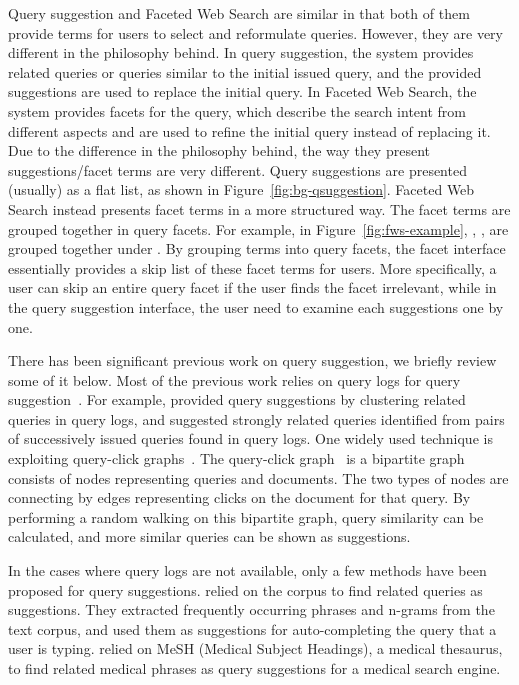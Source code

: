 Query suggestion and Faceted Web Search are similar in that both of them provide terms for users to select and reformulate queries. However, they are very different in the philosophy behind. In query suggestion, the system provides related queries or queries similar to the initial issued query, and the provided suggestions are used to replace the initial query. In Faceted Web Search, the system provides facets for the query, which describe the search intent from different aspects and are used to refine the initial query instead of replacing it. Due to the difference in the philosophy behind, the way they present suggestions/facet terms are very different. Query suggestions are presented (usually) as a flat list, as shown in Figure~\ref{fig:bg-qsuggestion}. Faceted Web Search instead presents facet terms in a more structured way. The facet terms are grouped together in query facets. For example, in Figure~\ref{fig:fws-example}, , ,  are grouped together under . By grouping terms into query facets, the facet interface essentially provides a skip list of these facet terms for users. More specifically, a user can skip an entire query facet if the user finds the facet irrelevant, while in the query suggestion interface, the user need to examine each suggestions one by one.


There has been significant previous work on query suggestion, we briefly review some of it below. Most of the previous work relies on query logs for query suggestion~\cite{baeza2004query,jones2006generating,mei2008query,ozertem2011suggestion}. For example, \citet{baeza2004query} provided query suggestions by clustering related queries in query logs, and \citet{jones2006generating} suggested strongly related queries identified from pairs of successively issued queries found in query logs. One widely used technique is exploiting query-click graphs~\cite{craswell2007random,mei2008query,ozertem2011suggestion}. The query-click graph~\cite{craswell2007random} is a bipartite graph consists of nodes representing queries and documents. The two types of nodes are connecting by edges representing clicks on the document for that query. By performing a random walking on this bipartite graph, query similarity can be calculated, and more similar queries can be shown as suggestions. 

In the cases where query logs are not available, only a few methods have been proposed for query suggestions. \citet{bhatia2011query} relied on the corpus to find related queries as suggestions. They extracted frequently occurring phrases and n-grams from the text corpus, and used them as suggestions for auto-completing the query that a user is typing.  \citet{luo2008medsearch} relied on MeSH (Medical Subject Headings), a medical thesaurus, to find related medical phrases as query suggestions for a medical search engine.

